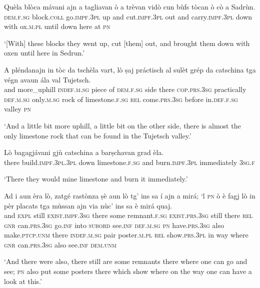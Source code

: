 \begin{linenumbers}
\gll   Quèla blòca mávani ajn a tagliavan ò a trèvan vidò cun bùfs tòcan ò cò a Sadrùn. \\
 \textsc{dem.f.sg} block.\textsc{coll} go.\textsc{impf.3pl} up and cut.\textsc{impf.3pl} out and carry.\textsc{impf.3pl} down  with ox.\textsc{m.pl} until down here at \textsc{pn}  \\
\end{linenumbers}
\medskip
\glt `[With] these blocks they went up, cut [them] out, and brought them down with oxen until here in Sedrun.'
\medskip

\begin{linenumbers}
\gll   A pléndanajn in tòc da tschèla vart, lò ṣaj práctisch al sulèt grép da catschina tga végn avaun ála val Tujetsch. \\
and more\_uphill \textsc{indef.m.sg} piece of \textsc{dem.f.sg} side there \textsc{cop.prs.3sg} practically \textsc{def.m.sg} only.\textsc{m.sg} rock of limestone.\textsc{f.sg} \textsc{rel} come.\textsc{prs.3sg} before in.\textsc{def.f.sg} valley \textsc{pn}   \\
\end{linenumbers}
\medskip
\glt `And a little bit more uphill, a little bit on the other side, there is almost the only limestone rock that can be found in the Tujetsch valley.'
\medskip

\begin{linenumbers}
\gll Lò bagagjávani gjù catschina a barṣchavan grad èla.   \\
there build.\textsc{impf.3pl.3pl} down limestone.\textsc{f.sg} and  burn.\textsc{impf.3pl} immediately \textsc{3sg.f}\\
\end{linenumbers}
\medskip
\glt `There they would mine limestone and burn it immediately.'
\medskip

\begin{linenumbers}
\gll Ad i aun èra lò, zatgé rastònza ṣè aun lò tg’ ins sa í ajn a mirá; `l \textsc{pn} ò è fagj\footnotemark{} lò in pèr placats tga mùssan ajn via nùc’ ins sa è mirá quaj.\\
and \textsc{expl} still \textsc{exist.impf.3sg} there some remnant.\textsc{f.sg} \textsc{exist.prs.3sg} still there \textsc{rel} \textsc{gnr} can.\textsc{prs.3sg} go.\textsc{inf} into \textsc{subord} see.\textsc{inf} \textsc{def.m.sg} \textsc{pn} have.\textsc{prs.3sg} also make.\textsc{ptcp.unm} there \textsc{indef.m.sg} pair poster.\textsc{m.pl} \textsc{rel} show.\textsc{prs.3pl} in way where \textsc{gnr} can.\textsc{prs.3sg} also see.\textsc{inf} \textsc{dem.unm} \\
\end{linenumbers}
\medskip
\glt `And there were also, there still are some remnants there where one can go and see; \textsc{pn} also put some posters there which show where on the way one can have a look at this.'
\medskip

